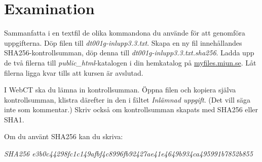 \documentclass[11pt,a4paper]{miunasgn}
\begin{document}
\section{Examination}
\label{sec:Examination}
\noindent
Sammanfatta i en textfil de olika kommandona du använde för att genomföra
uppgifterna.
Döp filen till \emph{dt001g-inlupp3.3.txt}.
Skapa en ny fil innehållandes SHA256-kontrollsumman, döp denna till
\emph{dt001g-inlupp3.3.txt.sha256}.
Ladda upp de två filerna till \emph{public\_html}-katalogen i din hemkatalog på
\url{myfiles.miun.se}.
Låt filerna ligga kvar tills att kursen är avslutad.

I WebCT ska du lämna in kontrollsumman.
Öppna filen och kopiera själva kontrollsumman, klistra därefter in den i fältet
\emph{Inlämnad uppgift}. (Det vill säga inte som kommentar.)
Skriv också om kontrollsumman skapats med SHA256 eller SHA1.
\begin{example}
	Om du använt SHA256 kan du skriva:
	\begin{center}
		\emph{SHA256
		e3b0c44298fc1c149afbf4c8996fb92427ae41e4649b934ca495991b7852b855}
	\end{center}
\end{example}



\end{document}
